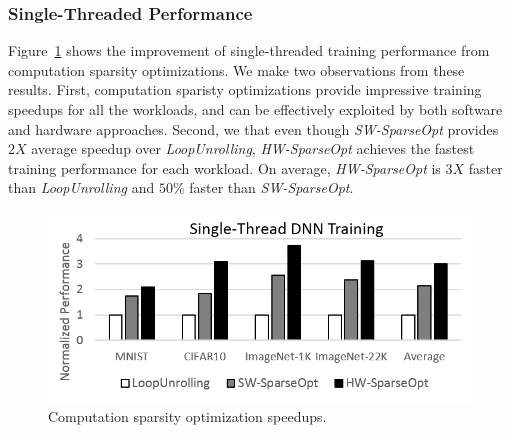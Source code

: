 \subsubsection{Single-Threaded Performance}
Figure~\ref{fig:computation_sparsity_speedup} shows the improvement of single-threaded training performance from computation sparsity optimizations.  We make two observations from these results.  First, computation sparisty optimizations provide impressive training speedups for all the workloads, and can be effectively exploited by both software and hardware approaches.  Second, we that even though {\it SW-SparseOpt} provides ~$2X$ average speedup over {\it LoopUnrolling}, {\it HW-SparseOpt} achieves the fastest training performance for each workload.  On average, {\it HW-SparseOpt} is $3X$ faster than {\it LoopUnrolling} and $50\%$ faster than {\it SW-SparseOpt}.  
\begin{figure}
 \centering
 \includegraphics[width=.95\columnwidth]{Figures/computation_sparsity_speedup.png}
\caption{Computation sparsity optimization speedups.}
 \label{fig:computation_sparsity_speedup}
 \end{figure}

